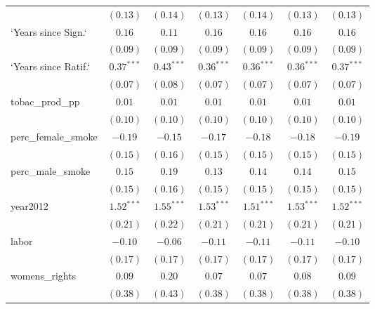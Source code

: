 \begin{table}[!h]
\begin{center}
\begin{tabular}{l c c c c c c }
                        & $(0.13)$     & $(0.14)$     & $(0.13)$     & $(0.14)$     & $(0.13)$     & $(0.13)$     \\
`Years since Sign.`     & $0.16$       & $0.11$       & $0.16$       & $0.16$       & $0.16$       & $0.16$       \\
                        & $(0.09)$     & $(0.09)$     & $(0.09)$     & $(0.09)$     & $(0.09)$     & $(0.09)$     \\
`Years since Ratif.`    & $0.37^{***}$ & $0.43^{***}$ & $0.36^{***}$ & $0.36^{***}$ & $0.36^{***}$ & $0.37^{***}$ \\
                        & $(0.07)$     & $(0.08)$     & $(0.07)$     & $(0.07)$     & $(0.07)$     & $(0.07)$     \\
tobac\_prod\_pp         & $0.01$       & $0.01$       & $0.01$       & $0.01$       & $0.01$       & $0.01$       \\
                        & $(0.10)$     & $(0.10)$     & $(0.10)$     & $(0.10)$     & $(0.10)$     & $(0.10)$     \\
perc\_female\_smoke     & $-0.19$      & $-0.15$      & $-0.17$      & $-0.18$      & $-0.18$      & $-0.19$      \\
                        & $(0.15)$     & $(0.16)$     & $(0.15)$     & $(0.15)$     & $(0.15)$     & $(0.15)$     \\
perc\_male\_smoke       & $0.15$       & $0.19$       & $0.13$       & $0.14$       & $0.14$       & $0.15$       \\
                        & $(0.15)$     & $(0.16)$     & $(0.15)$     & $(0.15)$     & $(0.15)$     & $(0.15)$     \\
year2012                & $1.52^{***}$ & $1.55^{***}$ & $1.53^{***}$ & $1.51^{***}$ & $1.53^{***}$ & $1.52^{***}$ \\
                        & $(0.21)$     & $(0.22)$     & $(0.21)$     & $(0.21)$     & $(0.21)$     & $(0.21)$     \\
labor                   & $-0.10$      & $-0.06$      & $-0.11$      & $-0.11$      & $-0.11$      & $-0.10$      \\
                        & $(0.17)$     & $(0.17)$     & $(0.17)$     & $(0.17)$     & $(0.17)$     & $(0.17)$     \\
womens\_rights          & $0.09$       & $0.20$       & $0.07$       & $0.07$       & $0.08$       & $0.09$       \\
                        & $(0.38)$     & $(0.43)$     & $(0.38)$     & $(0.38)$     & $(0.38)$     & $(0.38)$     \\

\end{tabular}
\end{center}
\end{table}
